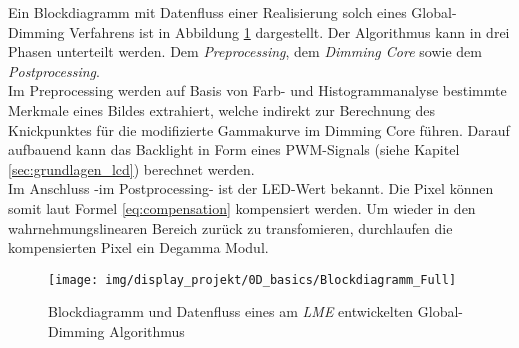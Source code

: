 Ein Blockdiagramm mit Datenfluss einer Realisierung solch eines Global-Dimming Verfahrens ist in Abbildung \ref{fig:dimming_block_full} dargestellt. Der Algorithmus kann in drei Phasen unterteilt werden. Dem \emph{Preprocessing}, dem \emph{Dimming Core} sowie dem \emph{Postprocessing}.\\
Im Preprocessing werden auf Basis von Farb- und Histogrammanalyse bestimmte Merkmale eines Bildes extrahiert, welche indirekt zur Berechnung des Knickpunktes für die modifizierte Gammakurve im Dimming Core führen. Darauf aufbauend kann das Backlight in Form eines PWM-Signals (siehe Kapitel \ref{sec:grundlagen_lcd}) berechnet werden.\\
Im Anschluss -im Postprocessing- ist der LED-Wert bekannt. Die Pixel können somit laut Formel \ref{eq:compensation} kompensiert werden. Um wieder in den wahrnehmungslinearen Bereich zurück zu transfomieren, durchlaufen die kompensierten Pixel ein Degamma Modul.
\begin{figure}[H]
	\centering
	\texttt{[image: img/display\_projekt/0D\_basics/Blockdiagramm\_Full]}
	\caption[Blockdiagramm eines Global-Dimming Algorithmus]{Blockdiagramm und Datenfluss eines am \emph{LME} entwickelten Global-Dimming Algorithmus \cite{Schmidt_edC16}}
	\label{fig:dimming_block_full}
\end{figure}

